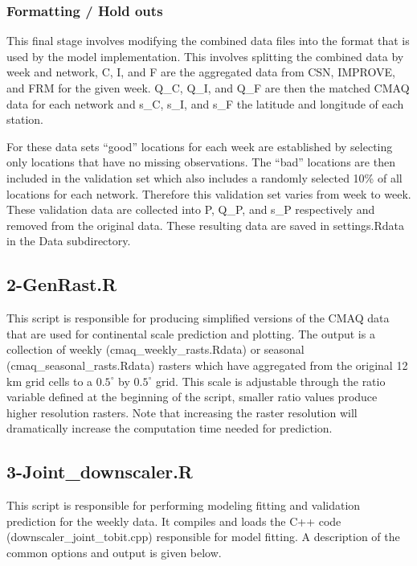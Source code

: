 \documentclass[11pt]{article}
\begin{document}
\subsubsection{Formatting / Hold outs}

This final stage involves modifying the combined data files into the format that is used by the model implementation. This involves splitting the combined data by week and network, C, I, and F are the aggregated data from CSN, IMPROVE, and FRM for the given week. Q\_C, Q\_I, and Q\_F are then the matched CMAQ data for each network and s\_C, s\_I, and s\_F the latitude and longitude of each station.

For these data sets ``good'' locations for each week are established by selecting only locations that have no missing observations. The ``bad'' locations are then included in the validation set which also includes a randomly selected 10\% of all locations for each network. Therefore this validation set varies from week to week. These validation data are collected into P, Q\_P, and s\_P respectively and removed from the original data. These resulting data are saved in settings.Rdata in the Data subdirectory.

\subsection{2-GenRast.R}

This script is responsible for producing simplified versions of the CMAQ data that are used for continental scale prediction and plotting. The output is a collection of weekly (cmaq\_weekly\_rasts.Rdata) or seasonal (cmaq\_seasonal\_rasts.Rdata) rasters which have aggregated from the original 12 km grid cells to a $0.5^{\circ}$ by $0.5^{\circ}$ grid. This scale is adjustable through the ratio variable defined at the beginning of the script, smaller ratio values produce higher resolution rasters. Note that increasing the raster resolution will dramatically increase the computation time needed for prediction.


\subsection{3-Joint\_downscaler.R}

This script is responsible for performing modeling fitting and validation prediction for the weekly data. It compiles and loads the C++ code (downscaler\_joint\_tobit.cpp) responsible for model fitting. A description of the common options and output is given below.
\end{document}
